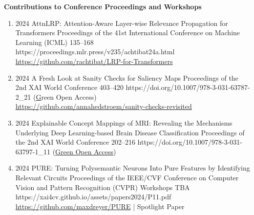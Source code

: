 \headedsection %
{\bf Contributions to Conference Proceedings and Workshops}{}
{
    \begin{enumerate}
        
        \item {}
        {2024}
        {AttnLRP: Attention-Aware Layer-wise Relevance Propagation for Transformers}
        {Proceedings of the 41st International Conference on Machine Learning (ICML)}
        {135--168}
        {https://proceedings.mlr.press/v235/achtibat24a.html}
        {
            \\\href{https://github.com/rachtibat/LRP-for-Transformers}{https://github.com/rachtibat/LRP-for-Transformers}
        }
        
        \item {}
                            {2024}
                            {A Fresh Look at Sanity Checks for Saliency Maps}
                            {Proceedings of the 2nd XAI World Conference}
                            {403--420}
                            {https://doi.org/10.1007/978-3-031-63787-2_21}
                            {(\href{https://arxiv.org/abs/2405.02383} Green Open Access)
                            \\\href{https://github.com/annahedstroem/sanity-checks-revisited}{https://github.com/annahedstroem/sanity-checks-revisited}}

        \item {}
                            {2024}
                            {Explainable Concept Mappings of MRI: Revealing the Mechanisms Underlying Deep Learning-based Brain Disease Classification}
                            {Proceedings of the 2nd XAI World Conference}
                            {202--216}
                            {https://doi.org/10.1007/978-3-031-63797-1_11}
                            {(\href{https://arxiv.org/abs/2404.10433}{Green Open Access})}


        \item {}
                            {2024}
                            {PURE: Turning Polysemantic Neurons Into Pure Features by Identifying Relevant Circuits}
                            {Proceedings of the IEEE/CVF Conference on Computer Vision and Pattern Recognition (CVPR) Workshops}
                            {TBA}
                            {https://xai4cv.github.io/assets/papers2024/P11.pdf}
                            {\\\href{https://github.com/maxdreyer/PURE}{https://github.com/maxdreyer/PURE} | 
                            Spotlight Paper}


\end{enumerate}}
